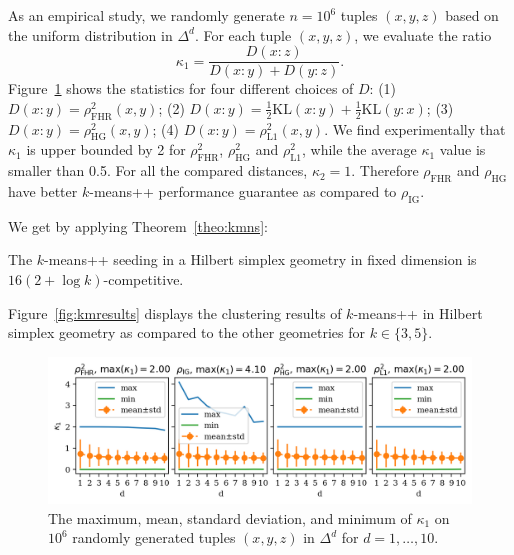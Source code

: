\documentclass[graybox]{svmult}
\def\KL{\mathrm{KL}}
\begin{document}
As an empirical study, we randomly generate $n=10^6$ tuples $(x, y, z)$ 
based on the uniform distribution in $\Delta^d$. For each tuple $(x,y,z)$,
we evaluate the ratio
$$
\kappa_1 = \frac{D(x:z)}{D(x:y)+D(y:z)}.
$$
Figure~\ref{fig:kappa} shows the statistics for four different choices of
$D$: (1) $D(x:y)=\rho_{\mathrm{FHR}}^2(x,y)$;
(2) $D(x:y)=\frac{1}{2}\KL(x:y)+\frac{1}{2}\KL(y:x)$;
(3) $D(x:y)=\rho^2_{\mathrm{HG}}(x,y)$;
(4) $D(x:y)= \rho^2_{\mathrm{L1}}(x,y)$.
We find experimentally that $\kappa_1$ is upper bounded by 2 for
$\rho^2_{\mathrm{FHR}}$, $\rho^2_{\mathrm{HG}}$
and $\rho^2_{\mathrm{L1}}$,
while the average $\kappa_1$ value is smaller than 0.5.
For all the compared distances, $\kappa_2=1$.
Therefore $\rho_{\mathrm{FHR}}$
and $\rho_{\mathrm{HG}}$ have better $k$-means++ performance guarantee as compared 
to $\rho_{\mathrm{IG}}$.


We get by applying Theorem~\ref{theo:kmns}:
\begin{corollary}
The $k$-means++ seeding in a  Hilbert simplex geometry in fixed dimension is $16 (2+\log k)$-competitive.
\end{corollary}


Figure~\ref{fig:kmresults} displays the clustering results of $k$-means++ in Hilbert simplex geometry as
compared to the other geometries for $k\in\{3,5\}$.

\begin{figure}[t]
\centering
\includegraphics[width=\textwidth]{kappa}
\caption{The maximum, mean, standard deviation, and minimum
of $\kappa_1$ on $10^6$ randomly generated tuples $(x,y,z)$ in $\Delta^d$ for
$d=1,\dots,10$.}\label{fig:kappa}
\end{figure}
\end{document}
